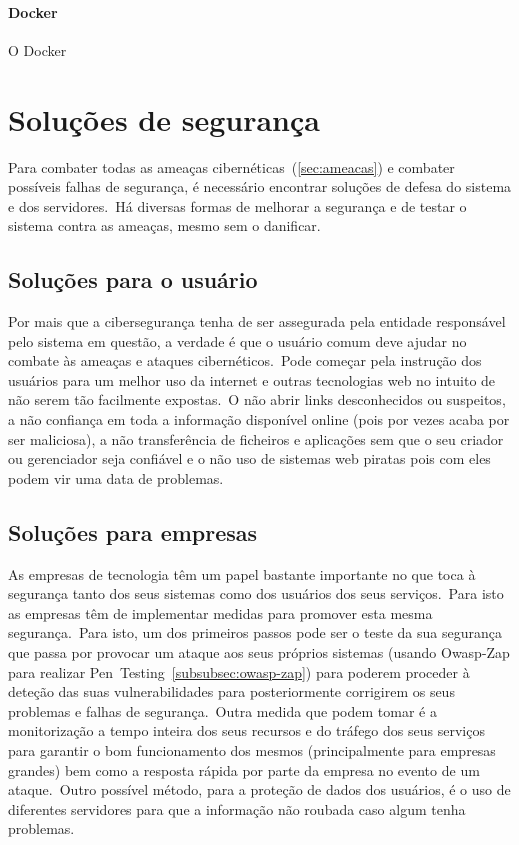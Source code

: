 \documentclass{report}
\begin{document}
\subsubsection{Docker}
\label{subsubsec:docker}
O Docker



\chapter{Soluções de segurança}
\label{ch:solucoes-de-seguranca}
Para combater todas as ameaças cibernéticas~(\ref{sec:ameacas}) e combater possíveis falhas de segurança, é necessário encontrar soluções de defesa do sistema e dos servidores.\ Há diversas formas de melhorar a segurança e de testar o sistema contra as ameaças, mesmo sem o danificar.
\section{Soluções para o usuário}
Por mais que a cibersegurança tenha de ser assegurada pela entidade responsável pelo sistema em questão, a verdade é que o usuário comum deve ajudar no combate às ameaças e ataques cibernéticos.\ Pode começar pela instrução dos usuários para um melhor uso da internet e outras tecnologias web no intuito de não serem tão facilmente expostas.\ O não abrir links desconhecidos ou suspeitos, a não confiança em toda a informação disponível online (pois por vezes acaba por ser maliciosa), a não transferência de ficheiros e aplicações sem que o seu criador ou gerenciador seja confiável e o não uso de sistemas web piratas pois com eles podem vir uma data de problemas.
\section{Soluções para empresas}
As empresas de tecnologia têm um papel bastante importante no que toca à segurança tanto dos seus sistemas como dos usuários dos seus serviços.\ Para isto as empresas têm de implementar medidas para promover esta mesma segurança.\ Para isto, um dos primeiros passos pode ser o teste da sua segurança que passa por provocar um ataque aos seus próprios sistemas (usando Owasp-Zap para realizar Pen~Testing~\ref{subsubsec:owasp-zap}) para poderem proceder à deteção das suas vulnerabilidades para posteriormente corrigirem os seus problemas e falhas de segurança.\ Outra medida que podem tomar é a monitorização a tempo inteira dos seus recursos e do tráfego dos seus serviços para garantir o bom funcionamento dos mesmos (principalmente para empresas grandes) bem como a resposta rápida por parte da empresa no evento de um ataque.\ Outro possível método, para a proteção de dados dos usuários, é o uso de diferentes servidores para que a informação não roubada caso algum tenha problemas.
\end{document}
